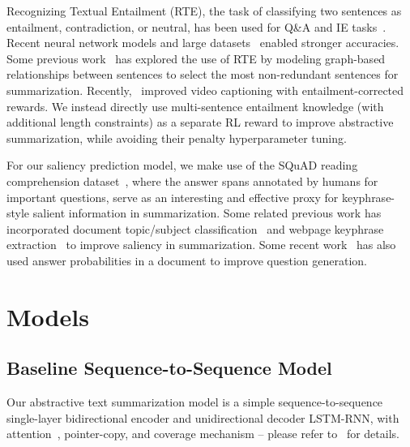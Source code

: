 \documentclass[11pt,a4paper]{article}
\begin{document}
Recognizing Textual Entailment (RTE), the task of classifying two sentences as entailment, contradiction, or neutral, has been used for Q\&A and IE tasks~\cite{harabagiu2006methods,dagan2006pascal,lai2014illinois,jimenez2014unal}. Recent neural network models and large datasets~\cite{bowman2015large,williams2017broad} enabled stronger accuracies. Some previous work~\cite{mehdad2013abstractive,gupta2014text} has explored the use of RTE by modeling graph-based relationships between sentences to select the most non-redundant sentences for summarization. Recently,~ improved video captioning with entailment-corrected rewards. We instead directly use  multi-sentence entailment knowledge (with additional length constraints) as a separate RL reward to improve abstractive summarization, while avoiding their penalty hyperparameter tuning.


For our saliency prediction model, we make use of the SQuAD reading comprehension dataset~\cite{rajpurkar2016squad}, where the answer spans annotated by humans for important questions, serve as an interesting and effective proxy for keyphrase-style salient information in summarization. Some related previous work has incorporated document topic/subject classification~\cite{isonuma2017extractive} and webpage keyphrase extraction~\cite{zhang2004world} to improve saliency in summarization.
Some recent work~ has also used answer probabilities in a document to improve question generation.
 
\section{Models}

\subsection{Baseline Sequence-to-Sequence Model}
Our abstractive text summarization model is a simple sequence-to-sequence single-layer bidirectional encoder and unidirectional decoder LSTM-RNN,
with attention~\cite{bahdanau2014neural}, pointer-copy, and coverage mechanism -- please refer to~ for details.
\end{document}
